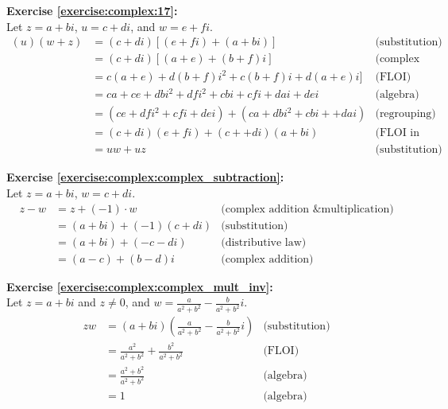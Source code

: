\noindent\textbf{Exercise \ref{exercise:complex:17}:}
\\
Let $z = a + bi$, $u = c + di$, and $w = e + fi$.
\begin{align*}
(u)(w + z) &= (c + di)[(e + fi) + (a + bi)] &\text{(substitution)}\\
&= (c + di)[(a + e) + (b + f)i] &\text{(complex addition)}\\
&= c(a + e) + d(b + f)i^{2} + c(b + f)i + d(a + e)i ] &\text{(FLOI)}\\
&= ca + ce + dbi^{2} + dfi^{2} + cbi + cfi + dai + dei    &\text{(algebra)}\\
&= (ce + dfi^{2} + cfi +dei) + (ca + dbi^{2} + cbi + +dai)  &\text{(regrouping)}\\
&= (c + di)(e + fi) + (c + + di)(a + bi)  &\text{(FLOI in reverse)}\\
&= uw + uz &\text{(substitution)}
\end{align*}

\noindent\textbf{Exercise \ref{exercise:complex:complex_subtraction}:}
\\
Let $z = a + bi$, $w = c + di$.
\begin{align*}
z - w &= z + (-1)\cdot w &\text{(complex addition \& multiplication)}\\
&= (a + bi) + (-1)(c + di) &\text{(substitution)}\\
&= (a + bi) + (-c - di) &\text{(distributive law)}\\
&= (a - c) + (b - d)i &\text{(complex addition)}
\end{align*}

\noindent\textbf{Exercise \ref{exercise:complex:complex_mult_inv}:}%
\\
Let $z = a + bi$ and $z \neq 0$, and $w=\frac{a}{a^{2}+b^{2}}- \frac{b}{a^{2}+b^{2}}i$.
\begin{align*}
zw &= (a + bi)\left(\frac{a}{a^{2}+b^{2}}- \frac{b}{a^{2}+b^{2}}i\right) &\text{(substitution)}\\
&= \frac{a^{2}}{a^{2}+b^{2}} + \frac{b^{2}}{a^{2}+b^{2}} &\text{(FLOI)}\\
&= \frac{a^{2} + b^{2}}{a^{2}+b^{2}} &\text{(algebra)}\\
&= 1 &\text{(algebra)}
\end{align*}

